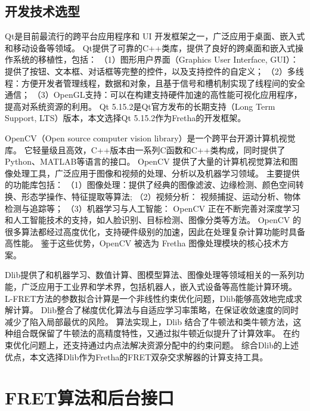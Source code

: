 \subsection{开发技术选型}
Qt是目前最流行的跨平台应用程序和 UI 开发框架之一，广泛应用于桌面、嵌入式和移动设备等领域。
Qt提供了可靠的C++类库，提供了良好的跨桌面和嵌入式操作系统的移植性，包括：
（1）图形用户界面（Graphics User Interface, GUI）：提供了按钮、文本框、对话框等完整的控件，以及支持控件的自定义；
（2）多线程：方便开发者管理线程，数据和对象，且基于信号和槽机制实现了线程间的安全通信；
（3）OpenGL支持：可以在构建支持硬件加速的高性能可视化应用程序，提高对系统资源的利用。
Qt 5.15.2是Qt官方发布的长期支持（Long Term Support, LTS）版本，本文选择Qt 5.15.2作为Fretha的开发框架。

OpenCV（Open source computer vision library）是一个跨平台开源计算机视觉库。
它轻量级且高效，C++版本由一系列C函数和C++类构成，同时提供了Python、MATLAB等语言的接口。
OpenCV 提供了大量的计算机视觉算法和图像处理工具，广泛应用于图像和视频的处理、分析以及机器学习领域。
主要提供的功能库包括：
（1）图像处理：提供了经典的图像滤波、边缘检测、颜色空间转换、形态学操作、特征提取等算法;
（2）视频分析： 视频捕捉、运动分析、物体检测与追踪等；
（3）机器学习与人工智能： OpenCV 正在不断完善对深度学习和人工智能技术的支持，如人脸识别、目标检测、图像分类等方法。
OpenCV 的很多算法都经过高度优化，支持硬件级别的加速，因此在处理复杂计算功能时具备高性能。
鉴于这些优势，OpenCV 被选为 Fretha 图像处理模块的核心技术方案。

Dlib提供了和机器学习、数值计算、图模型算法、图像处理等领域相关的一系列功能，广泛应用于工业界和学术界，包括机器人，嵌入式设备等高性能计算环境。
L-FRET方法的参数拟合计算是一个非线性约束优化问题，Dlib能够高效地完成求解计算。
Dlib整合了梯度优化算法与自适应学习率策略，在保证收敛速度的同时减少了陷入局部最优的风险。
算法实现上，Dlib 结合了牛顿法和类牛顿方法，这种组合既保留了牛顿法的高精度特性，又通过拟牛顿近似提升了计算效率。
在约束优化问题上，还支持通过内点法解决资源分配中的约束问题。
综合Dlib的上述优点，本文选择Dlib作为Fretha的FRET双杂交求解器的计算支持工具。

\section{FRET算法和后台接口}

